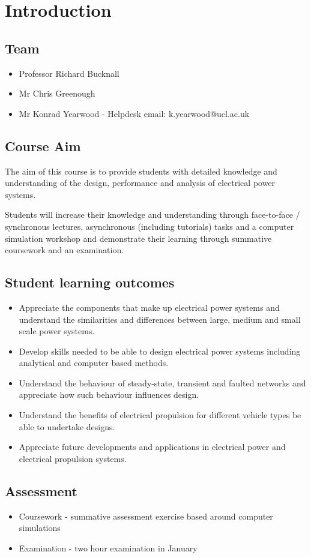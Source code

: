 \chapter{Introduction}
\section{Team}
\begin{itemize}
	\item Professor Richard Bucknall
	\item Mr Chris Greenough
	\item Mr Konrad Yearwood - Helpdesk email: k.yearwood@ucl.ac.uk
\end{itemize}
\section{Course Aim}
The aim of this course is to provide students with detailed knowledge and understanding of the design, performance and analysis of electrical power systems.

Students will increase their knowledge and understanding through face-to-face / synchronous lectures, asynchronous (including tutorials) tasks and a computer simulation workshop and demonstrate their learning through summative coursework and an examination.
\section{Student learning outcomes}
\begin{itemize}
	\item Appreciate the components that make up electrical power systems and understand the similarities and differences between large, medium and small scale power systems.
	\item Develop skills needed to be able to design electrical power systems including analytical and computer based methods.
	\item Understand the behaviour of steady-state, transient and faulted networks and appreciate how such behaviour influences design.
	\item Understand the benefits of electrical propulsion for different vehicle types be able to undertake designs.
	\item Appreciate future developments and applications in electrical power and electrical propulsion systems.
\end{itemize}
\section{Assessment}
\begin{itemize}
	\item Coursework - summative assessment exercise based around computer simulations
	\item Examination - two hour examination in January
\end{itemize}
